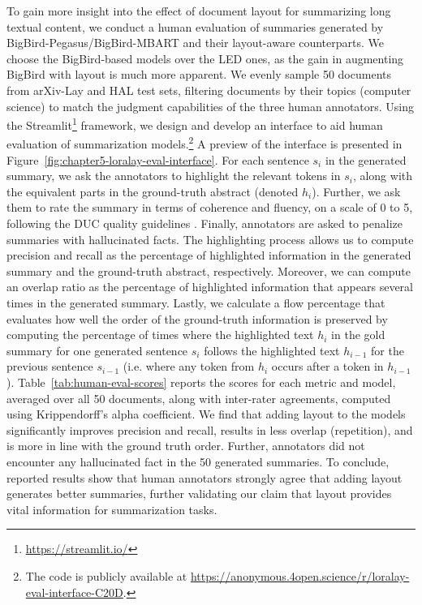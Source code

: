 To gain more insight into the effect of document layout for summarizing long textual content, we conduct a human evaluation of summaries generated by BigBird-Pegasus/BigBird-MBART and their layout-aware counterparts. We choose the BigBird-based models over the LED ones, as the gain in augmenting BigBird with layout is much more apparent. We evenly sample 50 documents from arXiv-Lay and HAL test sets, filtering documents by their topics (computer science) to match the judgment capabilities of the three human annotators. 
Using the Streamlit\footnote{\url{https://streamlit.io/}} framework, we design and develop an interface to aid human evaluation of summarization models.\footnote{The code is publicly available at \url{https://anonymous.4open.science/r/loralay-eval-interface-C20D}.} A preview of the interface is presented in Figure~\ref{fig:chapter5-loralay-eval-interface}.
For each sentence $s_i$ in the generated summary, we ask the annotators to highlight the relevant tokens in $s_i$, along with the equivalent parts in the ground-truth abstract (denoted $h_i$). Further, we ask them to rate the summary in terms of coherence and fluency, on a scale of 0 to 5, following the DUC quality guidelines \citep{dang2005overview}. Finally, annotators are asked to penalize summaries with hallucinated facts. The highlighting process allows us to compute precision and recall as the percentage of highlighted information in the generated summary and the ground-truth abstract, respectively. Moreover, we can compute an overlap ratio as the percentage of highlighted information that appears several times in the generated summary. Lastly, we calculate a flow percentage that evaluates how well the order of the ground-truth information is preserved by computing the percentage of times where the highlighted text $h_i$ in the gold summary for one generated sentence $s_i$ follows the highlighted text $h_{i-1}$ for the previous sentence $s_{i-1}$ (i.e. where any token from $h_i$ occurs after a token in $h_{i-1}$).
Table~\ref{tab:human-eval-scores} reports the scores for each metric and model, averaged over all 50 documents, along with inter-rater agreements, computed using Krippendorff's alpha coefficient. We find that adding layout to the models significantly improves precision and recall, results in less overlap (repetition), and is more in line with the ground truth order. Further, annotators did not encounter any hallucinated fact in the 50 generated summaries. To conclude, reported results show that human annotators strongly agree that adding layout generates better summaries, further validating our claim that layout provides vital information for summarization tasks.

